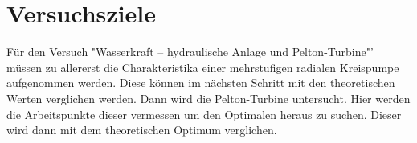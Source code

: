 \section{Versuchsziele}
Für den Versuch "Wasserkraft – hydraulische Anlage und Pelton-Turbine"' müssen zu allererst die Charakteristika einer mehrstufigen radialen Kreispumpe aufgenommen werden. Diese können im nächsten Schritt mit den theoretischen Werten verglichen werden. Dann wird die Pelton-Turbine untersucht. Hier werden die Arbeitspunkte dieser vermessen um den Optimalen heraus zu suchen. Dieser wird dann mit dem theoretischen Optimum verglichen.
